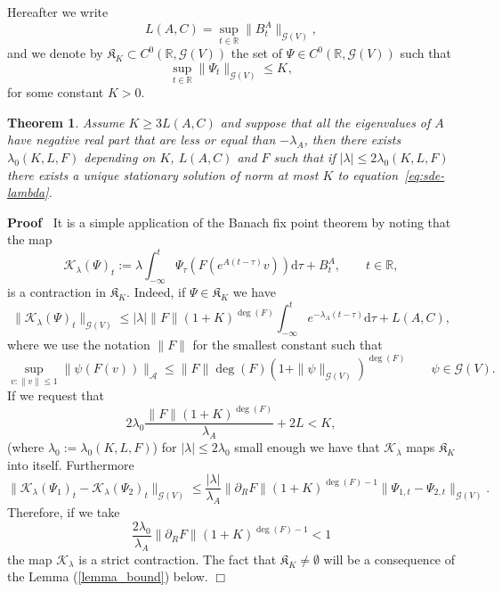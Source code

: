 \documentclass{article}
\newcommand{\assign}{:=}
\newcommand{\mathd}{\mathrm{d}}
\newenvironment{proof}{\noindent\textbf{Proof\ }}{\hspace*{\fill}$\Box$\medskip}
\newtheorem{theorem}{Theorem}
\begin{document}
Hereafter we write
\[ L (A, C) = \sup_{t \in \mathbb{R}} \| B^A_t \|_{\mathcal{G} (V)}, \]
and we denote by $\mathfrak{K}_K \subset C^0 (\mathbb{R}, \mathcal{G} (V))$
the set of $\Psi \in C^0 (\mathbb{R}, \mathcal{G} (V))$ such that
\[ \sup_{t \in \mathbb{R}} \| \Psi_t \|_{\mathcal{G} (V)} \leqslant K_{}, \]
for some constant $K > 0$.

\begin{theorem}
  \label{theorem_stationary}Assume $K \geqslant 3 L (A, C)$ and suppose that
  all the eigenvalues of $A$ have negative real part that are less or equal
  than $- \lambda_A$, then there exists $\lambda_0 (K, L, F)$ depending on
  $K$, $L (A, C)$ and $F$ such that if $| \lambda | \leqslant 2 \lambda_0 (K,
  L, F)$ there exists a unique stationary solution of norm at most $K$ to
  equation~{\eqref{eq:sde-lambda}}.
\end{theorem}

\begin{proof}
  It is a simple application of the Banach fix point theorem by noting that
  the map
  \[ \mathcal{K}_{\lambda} (\Psi)_t \assign \lambda \int_{- \infty}^t
     \Psi_{\tau} (F (e^{A (t - \tau)} v)) \mathd \tau + B^A_t, \qquad t \in
     \mathbb{R}, \]
  is a contraction in $\mathfrak{K}_K$. Indeed, if $\Psi \in \mathfrak{K}_K$
  we have
  \[ \| \mathcal{K}_{\lambda} (\Psi)_t \|_{\mathcal{G} (V)} \leqslant |
     \lambda |  \| F \| (1 + K)^{\deg (F)} \int_{- \infty}^t e^{- \lambda_A (t
     - \tau)} \mathd \tau + L (A, C), \]
  where we use the notation $\| F \|$ for the smallest constant such that
  \[ \sup_{v : \| v \| \leqslant 1}  \| \psi (F (v)) \|_{\mathcal{A}}
     \leqslant \| F \| \deg (F) (1 + \| \psi \|_{\mathcal{G} (V)})^{\deg (F)}
     \qquad \psi \in \mathcal{G} (V) . \]
  If we request that
  \begin{equation}
    2 \lambda_0 \frac{\| F \| (1 + K)^{\deg (F)}}{\lambda_A} + 2 L < K,
    \label{eq:contraction2}
  \end{equation}
  (where $\lambda_0 \assign \lambda_0 (K, L, F)$) for $| \lambda | \leqslant 2
  \lambda_0$ small enough we have that $\mathcal{K}_{\lambda}$ maps
  $\mathfrak{K}_K$ into itself. Furthermore
  \[ \| \mathcal{K}_{\lambda} (\Psi_1)_t - \mathcal{K}_{\lambda} (\Psi_2)_t
     \|_{\mathcal{G} (V)} \leqslant \frac{| \lambda |}{\lambda_A} \|
     \partial_R F \| (1 + K)^{\deg (F) - 1} \| \Psi_{1, t} - \Psi_{2, t}
     \|_{\mathcal{G} (V)} . \]
  Therefore, if we take
  \begin{equation}
    \frac{2 \lambda_0}{\lambda_A} \| \partial_R F \| (1 + K)^{\deg (F) - 1} <
    1 \label{eq:contraction}
  \end{equation}
  the map $\mathcal{K}_{\lambda}$ is a strict contraction. The fact that
  $\mathfrak{K}_K \neq \emptyset$ will be a consequence of the Lemma
  (\ref{lemma_bound}) below.
\end{proof}
\end{document}
